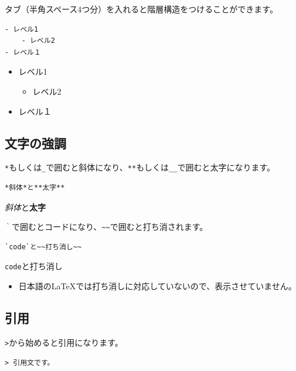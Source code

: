 \documentclass[]{bxjsreport}
\providecommand{\tightlist}{%
  \setlength{\itemsep}{0pt}\setlength{\parskip}{0pt}}
\let\asdf\section
\renewcommand{\section}{\chapter}
\let\asdff\subsection
\renewcommand{\subsection}{\asdf}
\renewcommand{\subsubsection}{\asdff}
\begin{document}
タブ（半角スペース4つ分）を入れると階層構造をつけることができます。

\begin{verbatim}
- レベル1
    - レベル2
- レベル１
\end{verbatim}

\begin{itemize}
\tightlist
\item
  レベル1

  \begin{itemize}
  \tightlist
  \item
    レベル2
  \end{itemize}
\item
  レベル１
\end{itemize}

\hypertarget{ux6587ux5b57ux306eux5f37ux8abf}{%
\subsubsection{文字の強調}\label{ux6587ux5b57ux306eux5f37ux8abf}}

\texttt{*}もしくは\texttt{\_}で囲むと斜体になり、\texttt{**}もしくは\texttt{\_\_}で囲むと太字になります。

\begin{verbatim}
*斜体*と**太字**
\end{verbatim}

\emph{斜体}と\textbf{太字}

\texttt{｀}で囲むとコードになり、\texttt{\textasciitilde{}\textasciitilde{}}で囲むと打ち消されます。

\begin{verbatim}
`code`と~~打ち消し~~
\end{verbatim}

\texttt{code}と打ち消し

\begin{itemize}
\tightlist
\item
  日本語のLaTeXでは打ち消しに対応していないので、表示させていません。
\end{itemize}

\hypertarget{ux5f15ux7528}{%
\subsubsection{引用}\label{ux5f15ux7528}}

\texttt{\textgreater{}}から始めると引用になります。

\begin{verbatim}
> 引用文です。
\end{verbatim}
\end{document}
